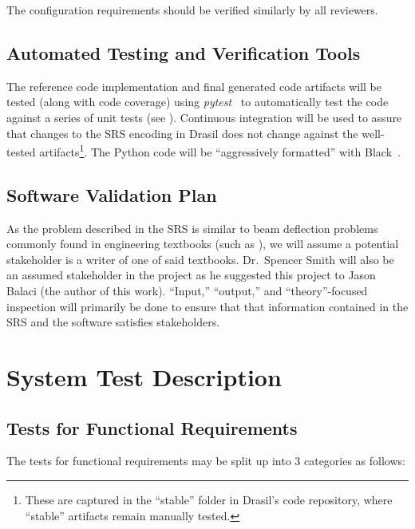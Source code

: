\documentclass[12pt, titlepage]{article}
\begin{document}
The configuration requirements should be verified similarly by all reviewers.

\subsection{Automated Testing and Verification Tools}

The reference code implementation and final generated code artifacts will be
tested (along with code coverage) using \textit{pytest}~\cite{PyTest} to
automatically test the code against a series of unit tests (see
). Continuous integration will be used to assure
that changes to the SRS encoding in Drasil does not change against the
well-tested artifacts\footnote{These are captured in the ``stable'' folder in
    Drasil's code repository, where ``stable'' artifacts remain manually tested.}.
The Python code will be ``aggressively formatted'' with
Black~\cite{PythonBlack}.

\subsection{Software Validation Plan}

As the problem described in the SRS is similar to beam deflection problems
commonly found in engineering textbooks (such as \cite{BeerJohnston1981}), we
will assume a potential stakeholder is a writer of one of said textbooks.
Dr.~Spencer Smith will also be an assumed stakeholder in the project as he
suggested this project to Jason Balaci (the author of this work). ``Input,''
``output,'' and ``theory''-focused inspection will primarily be done to ensure
that that information contained in the SRS and the software satisfies
stakeholders.

\newpage{}

\section{System Test Description}

\subsection{Tests for Functional Requirements}

The tests for functional requirements may be split up into 3 categories as
follows:
\end{document}
